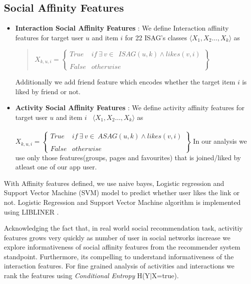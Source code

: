 \subsection{Social Affinity Features}
\begin{itemize}
  \item \textbf{Interaction Social Affinity Features} : We define Interaction affinity features for target user $u$ and item $i$ for 22 ISAG's classes 
  $ \langle X_{1},X_{2}\ldots,X_{k}\rangle$ as
  \begin{quote}
  \begin{math}
   X_{k,u,i} = \begin{Bmatrix}
   		True & if\ \exists\ v\in \ \ ISAG(u,k) \wedge likes(v,i)\\ \\
   		False & otherwise
   \end{Bmatrix}
  \end{math}
  \end{quote}
  Additionally we add friend feature which encodes whether the target item $i$ is liked by friend or not.
  \item \textbf{Activity Social Affinity Features} : We define activity affinity features for target user $u$ and item $i$   \
  $ \langle X_{1},X_{2}\ldots,X_{k}\rangle$ as\\ \\
  \begin{math}
   X_{k,u,i} = \begin{Bmatrix}
   		True & if\ \exists\ v\in \ ASAG(u,k) \wedge likes(v,i)\\ \\
   		False & otherwise
   \end{Bmatrix}
  \end{math}
	In our analysis we use only those features(groups, pages and favourites) that is joined/liked by atleast one of our app user.
\end{itemize}

With Affinity features defined, we use naive bayes, Logistic regression and Support Vector Machine (SVM) model to predict whether 
user likes the link or not. Logistic Regression and Support Vector Machine algorithm is implemented using LIBLINER \cite{liblinear}.

Acknowledging the fact that, in real world social recommendation task, activitiy features grows very quickly as number of user in social 
networks increase we explore informativeness of social affinity features from the recommender system standpoint. Furthermore, its compelling
to understand informativeness of the interaction features. For fine grained analysis of activities and interactions we rank the features using
\textit{Conditional Entropy} H(Y$|$X=true).

